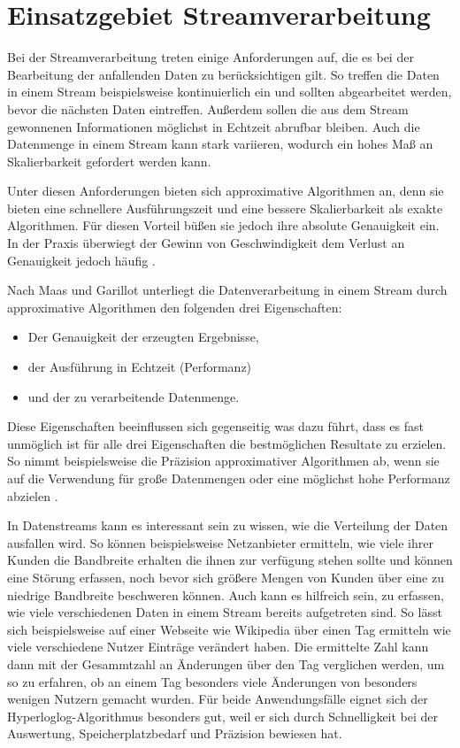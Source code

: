 \section{Einsatzgebiet Streamverarbeitung}
Bei der Streamverarbeitung treten einige Anforderungen auf, 
die es bei der Bearbeitung der anfallenden Daten zu berücksichtigen gilt. 
So treffen die Daten in einem Stream beispielsweise kontinuierlich ein 
und sollten abgearbeitet werden, bevor die nächsten Daten eintreffen. 
Außerdem sollen die aus dem Stream gewonnenen Informationen möglichst in Echtzeit abrufbar bleiben.
Auch die Datenmenge in einem Stream kann stark variieren, wodurch ein hohes Maß an Skalierbarkeit gefordert werden kann.

Unter diesen Anforderungen bieten sich approximative Algorithmen an, denn sie bieten eine schnellere Ausführungszeit und eine bessere Skalierbarkeit als exakte Algorithmen. 
Für diesen Vorteil büßen sie jedoch ihre absolute Genauigkeit ein. 
In der Praxis überwiegt der Gewinn von Geschwindigkeit dem Verlust an Genauigkeit jedoch häufig \cite{maas2019}. 

Nach Maas und Garillot \cite{maas2019} unterliegt die Datenverarbeitung in einem Stream durch approximative Algorithmen den folgenden drei Eigenschaften:  

\begin{itemize}
\item
Der Genauigkeit der erzeugten Ergebnisse,
\item
der Ausführung in Echtzeit (Performanz)
\item
und der zu verarbeitende Datenmenge.
\end{itemize}

Diese Eigenschaften beeinflussen sich gegenseitig was dazu führt, 
dass es fast unmöglich ist für alle drei Eigenschaften die bestmöglichen Resultate zu erzielen.
So nimmt beispielsweise die Präzision approximativer Algorithmen ab, 
wenn sie auf die Verwendung für große Datenmengen oder eine möglichst hohe Performanz abzielen \cite{maas2019}.

In Datenstreams kann es interessant sein zu wissen, 
wie die Verteilung der Daten ausfallen wird. 
So können beispielsweise Netzanbieter ermitteln, 
wie viele ihrer Kunden die Bandbreite erhalten die ihnen zur verfügung stehen sollte 
und können eine Störung erfassen, 
noch bevor sich größere Mengen von Kunden über eine zu niedrige Bandbreite beschweren können.
Auch kann es hilfreich sein, zu erfassen, 
wie viele verschiedenen Daten in einem Stream bereits aufgetreten sind. 
So lässt sich beispielsweise auf einer Webseite wie Wikipedia über einen Tag ermitteln wie viele verschiedene Nutzer Einträge verändert haben. 
Die ermittelte Zahl kann dann mit der Gesammtzahl an Änderungen über den Tag verglichen werden, 
um so zu erfahren, ob an einem Tag besonders viele Änderungen von besonders wenigen Nutzern gemacht wurden.
Für beide Anwendungsfälle eignet sich der Hyperloglog-Algorithmus besonders gut, 
weil er sich durch Schnelligkeit bei der Auswertung, 
Speicherplatzbedarf und Präzision bewiesen hat.